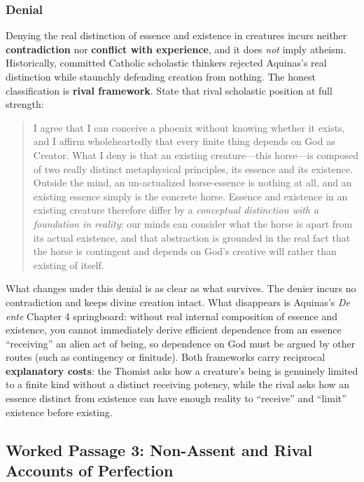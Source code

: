 \subsubsection*{Denial}

Denying the real distinction of essence and existence in creatures incurs neither \textbf{contradiction} nor \textbf{conflict with experience}, and it does \emph{not} imply atheism. Historically, committed Catholic scholastic thinkers rejected Aquinas's real distinction while staunchly defending creation from nothing. The honest classification is \textbf{rival framework}. State that rival scholastic position at full strength:

\begin{quote}
I agree that I can conceive a phoenix without knowing whether it exists, and I affirm wholeheartedly that every finite thing depends on God as Creator. What I deny is that an existing creature---this horse---is composed of two really distinct metaphysical principles, its essence and its existence. Outside the mind, an un-actualized horse-essence is nothing at all, and an existing essence simply is the concrete horse. Essence and existence in an existing creature therefore differ by a \emph{conceptual distinction with a foundation in reality}: our minds can consider what the horse is apart from its actual existence, and that abstraction is grounded in the real fact that the horse is contingent and depends on God's creative will rather than existing of itself.
\end{quote}

What changes under this denial is as clear as what survives. The denier incurs no contradiction and keeps divine creation intact. What disappears is Aquinas's \emph{De ente} Chapter 4 springboard: without real internal composition of essence and existence, you cannot immediately derive efficient dependence from an essence ``receiving'' an alien act of being, so dependence on God must be argued by other routes (such as contingency or finitude). Both frameworks carry reciprocal \textbf{explanatory costs}: the Thomist asks how a creature's being is genuinely limited to a finite kind without a distinct receiving potency, while the rival asks how an essence distinct from existence can have enough reality to ``receive'' and ``limit'' existence before existing.

\subsection{Worked Passage 3: Non-Assent and Rival Accounts of Perfection}

